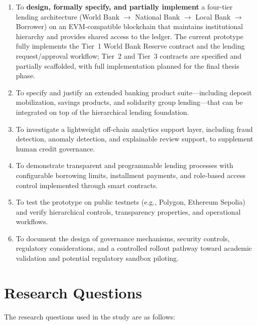 \documentclass[12pt,a4paper]{report}
\begin{document}
\begin{enumerate}[noitemsep]
\item To \textbf{design, formally specify, and partially implement} a four-tier lending architecture (World Bank $\to$ National Bank $\to$ Local Bank $\to$ Borrower) on an EVM-compatible blockchain that maintains institutional hierarchy and provides shared access to the ledger. The current prototype fully implements the Tier~1 World Bank Reserve contract and the lending request/approval workflow; Tier~2 and Tier~3 contracts are specified and partially scaffolded, with full implementation planned for the final thesis phase.
\item To specify and justify an extended banking product suite---including deposit mobilization, savings products, and solidarity group lending---that can be integrated on top of the hierarchical lending foundation.
\item To investigate a lightweight off-chain analytics support layer, including fraud detection, anomaly detection, and explainable review support, to supplement human credit governance.
\item To demonstrate transparent and programmable lending processes with configurable borrowing limits, installment payments, and role-based access control implemented through smart contracts.
\item To test the prototype on public testnets (e.g., Polygon, Ethereum Sepolia) and verify hierarchical controls, transparency properties, and operational workflows.
\item To document the design of governance mechanisms, security controls, regulatory considerations, and a controlled rollout pathway toward academic validation and potential regulatory sandbox piloting.
\end{enumerate}

\section{Research Questions}

The research questions used in the study are as follows:
\end{document}
